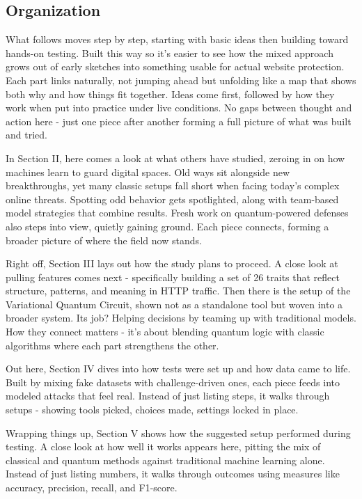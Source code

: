 \documentclass[journal,onecolumn]{IEEEtran}
\begin{document}
\subsection{Organization}
What follows moves step by step, starting with basic ideas then building toward hands-on testing. Built this way so it's easier to see how the mixed approach grows out of early sketches into something usable for actual website protection. Each part links naturally, not jumping ahead but unfolding like a map that shows both why and how things fit together. Ideas come first, followed by how they work when put into practice under live conditions. No gaps between thought and action here - just one piece after another forming a full picture of what was built and tried.

In Section II, here comes a look at what others have studied, zeroing in on how machines learn to guard digital spaces. Old ways sit alongside new breakthroughs, yet many classic setups fall short when facing today's complex online threats. Spotting odd behavior gets spotlighted, along with team-based model strategies that combine results. Fresh work on quantum-powered defenses also steps into view, quietly gaining ground. Each piece connects, forming a broader picture of where the field now stands.

Right off, Section III lays out how the study plans to proceed. A close look at pulling features comes next - specifically building a set of 26 traits that reflect structure, patterns, and meaning in HTTP traffic. Then there is the setup of the Variational Quantum Circuit, shown not as a standalone tool but woven into a broader system. Its job? Helping decisions by teaming up with traditional models. How they connect matters - it's about blending quantum logic with classic algorithms where each part strengthens the other.

Out here, Section IV dives into how tests were set up and how data came to life. Built by mixing fake datasets with challenge-driven ones, each piece feeds into modeled attacks that feel real. Instead of just listing steps, it walks through setups - showing tools picked, choices made, settings locked in place.

Wrapping things up, Section V shows how the suggested setup performed during testing. A close look at how well it works appears here, pitting the mix of classical and quantum methods against traditional machine learning alone. Instead of just listing numbers, it walks through outcomes using measures like accuracy, precision, recall, and F1-score.
\end{document}
